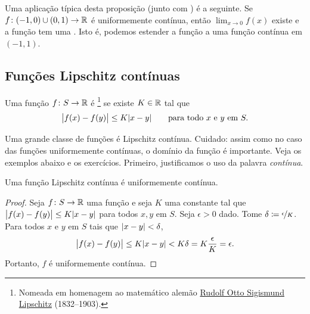 Uma aplicação típica desta proposição (junto com
) é a seguinte.
Se $f \colon (-1,0) \cup (0,1) \to {\mathbb{R}}$ é uniformemente contínua,
então $\lim_{x\to 0} f(x)$ existe e a função tem uma
\emph{}.
Isto é, podemos estender a função a uma função contínua em $(-1,1)$.


\subsection{Funções Lipschitz contínuas}

\begin{defn}
Uma função $f \colon S \to {\mathbb{R}}$
é \emph{}%
\footnote{Nomeada em homenagem ao matemático alemão
\href{https://en.wikipedia.org/wiki/Rudolf_Lipschitz}{Rudolf Otto Sigismund Lipschitz}
(1832--1903).} se existe $K \in {\mathbb{R}}$ tal que
\begin{equation*}
\bigl\lvert {f(x)-f(y)} \bigr\rvert \leq K \lvert {x-y} \rvert
\qquad \text{para todo } x \text{ e } y \text{ em } S.
\end{equation*}
\end{defn}

Uma grande classe de funções é Lipschitz contínua. Cuidado: assim como no
caso das funções uniformemente contínuas, o domínio da função é importante.
Veja os exemplos abaixo e os exercícios. Primeiro, justificamos o uso da
palavra \emph{contínua}.

\begin{prop}
Uma função Lipschitz contínua é uniformemente contínua.
\end{prop}

\begin{proof}
Seja $f \colon S \to {\mathbb{R}}$ uma função e seja $K$ uma constante tal que
$\bigl\lvert {f(x)-f(y)} \bigr\rvert \leq K \lvert {x-y} \rvert$
para todos $x, y$ em $S$.
Seja $\epsilon > 0$ dado. Tome $\delta \coloneqq
\nicefrac{\epsilon}{K}$.
Para todos $x$ e $y$ em $S$ tais que
$\lvert {x-y} \rvert < \delta$,
\begin{equation*}
\bigl\lvert {f(x)-f(y)} \bigr\rvert \leq K \lvert {x-y} \rvert < K \delta = K \frac{\epsilon}{K} =
\epsilon .
\end{equation*}
Portanto, $f$ é uniformemente contínua.
\end{proof}

